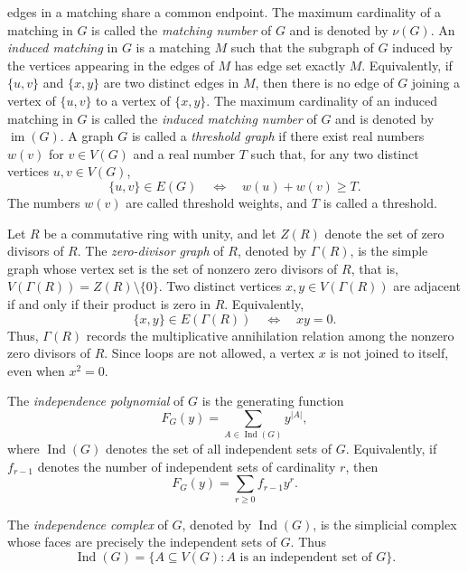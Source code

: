 \documentclass[12pt]{article}
\theoremstyle{definition}
\begin{document}
edges in a matching share a common endpoint. The maximum cardinality of a
matching in $G$ is called the \emph{matching number} of $G$ and is denoted by
$\nu(G)$.
 An \emph{induced matching} in $G$ is a matching $M$ such that the subgraph of
$G$ induced by the vertices appearing in the edges of $M$ has edge set exactly
$M$. Equivalently, if $\{u,v\}$ and $\{x,y\}$ are two distinct edges in $M$,
then there is no edge of $G$ joining a vertex of $\{u,v\}$ to a vertex of
$\{x,y\}$. The maximum cardinality of an induced matching in $G$ is called the
\emph{induced matching number} of $G$ and is denoted by $\operatorname{im}(G)$.
A graph $G$ is called a \emph{threshold graph} if there exist real numbers
$w(v)$ for $v\in V(G)$ and a real number $T$ such that, for any two distinct
vertices $u,v\in V(G)$,
$$
\{u,v\}\in E(G)\quad\Longleftrightarrow\quad w(u)+w(v)\ge T.
$$
The numbers $w(v)$ are called threshold weights, and $T$ is called a threshold. 

Let $R$ be a commutative ring with unity, and let $Z(R)$ denote the set of zero
divisors of $R$. The \emph{zero-divisor graph} of $R$, denoted by $\Gamma(R)$,
is the simple graph whose vertex set is the set of nonzero zero divisors of $R$,
that is,
$ V(\Gamma(R))=Z(R)\setminus\{0\}. $
Two distinct vertices $x,y\in V(\Gamma(R))$ are adjacent if and only if their
product is zero in $R$. Equivalently,
$$
\{x,y\}\in E(\Gamma(R))
\quad\Longleftrightarrow\quad
xy=0.
$$
Thus, $\Gamma(R)$ records the multiplicative annihilation relation among the
nonzero zero divisors of $R$. Since loops are not allowed, a vertex $x$ is not
joined to itself, even when $x^2=0$.

The \emph{independence polynomial} of $G$ is the generating function
$$
F_G(y)=\sum_{A\in \operatorname{Ind}(G)} y^{|A|},
$$
where $\operatorname{Ind}(G)$ denotes the set of all independent sets of $G$.
Equivalently, if $f_{r-1}$ denotes the number of independent sets of cardinality
$r$, then
$$
F_G(y)=\sum_{r\ge 0} f_{r-1}y^r.
$$

The \emph{independence complex} of $G$, denoted by $\operatorname{Ind}(G)$, is
the simplicial complex whose faces are precisely the independent sets of $G$.
Thus
$$
\operatorname{Ind}(G)=\{A\subseteq V(G):A\text{ is an independent set of }G\}.
$$
\end{document}
